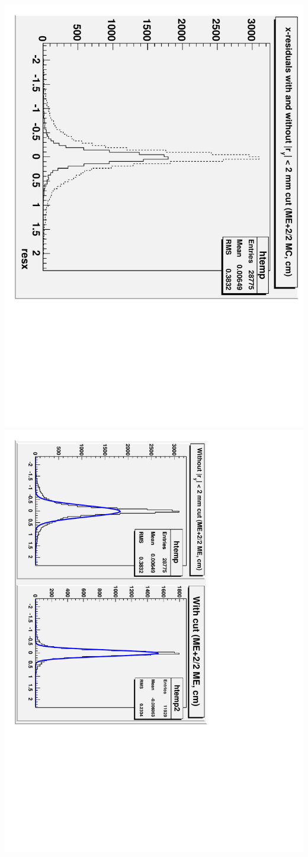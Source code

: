 \documentclass[compress]{beamer}
\begin{document}
\begin{frame}
\vfill
\begin{columns}
\includegraphics[height=\linewidth, angle=90]{MC_residuals_detail2-xprojection.pdf}
\includegraphics[height=\linewidth, angle=90]{MC_residuals_detail2-xprojection-fits.pdf}
\end{columns}
\end{frame}
\end{document}
